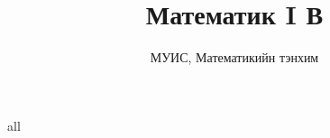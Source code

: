 \documentclass[11pt,a4paper,oneside]{book}
\begin{document}
\def\ALL{all}
\ifx\LECTURE\ALL
  \title{Математик I В\\[4pt]\large\coursename}
  \author{МУИС, Математикийн тэнхим}
  \date{\semester}
  \maketitle
  \tableofcontents
  
  
  
  
\else
  
\fi
\end{document}
